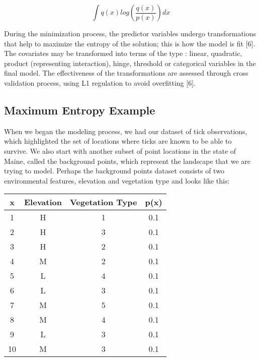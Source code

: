 \begin{equation}
\int q(x)log(\frac{q(x)}{p(x)}) dx
\end{equation}


\noindent  During the minimization process, the predictor variables undergo transformations that help to maximize the entropy of the solution; this is how the model is fit [6]. The covariates may be transformed into terms of the type : linear, quadratic, product (representing interaction), hinge, threshold or categorical variables in the final model. The effectiveness of the transformations are assessed through cross validation process, using L1 regulation to avoid overfitting [6].  \newline


\subsection{Maximum Entropy Example}

\noindent When we began the modeling process, we had our dataset of tick observations, which highlighted the set of locations where ticks are known to be able to survive. We also start with another subset of point locations in the state of Maine, called the background points, which represent the landscape that we are trying to model. Perhaps the background points dataset consists of two environmental features, elevation and vegetation type and looks like this: 

\begin{center}
 \begin{tabular}{||c c c c||} 
 \hline
 x & Elevation & Vegetation Type & p(x) \\ [0.5ex] 
 \hline\hline
 1 & H &  1& 0.1  \\ 
 \hline
  2 & H & 3 & 0.1\\
 \hline
   3 & H & 2 & 0.1\\
 \hline
 4 & M & 2 & 0.1  \\
 \hline
  5 & L & 4 & 0.1 \\
 \hline
   6 & L & 3 & 0.1\\
 \hline
  7 & M & 5 & 0.1 \\
 \hline
   8 & M & 4 & 0.1\\
 \hline
 9 & L & 3 & 0.1 \\
 \hline
   10 & M & 3 & 0.1\\
 \hline
\end{tabular}
\end{center}


